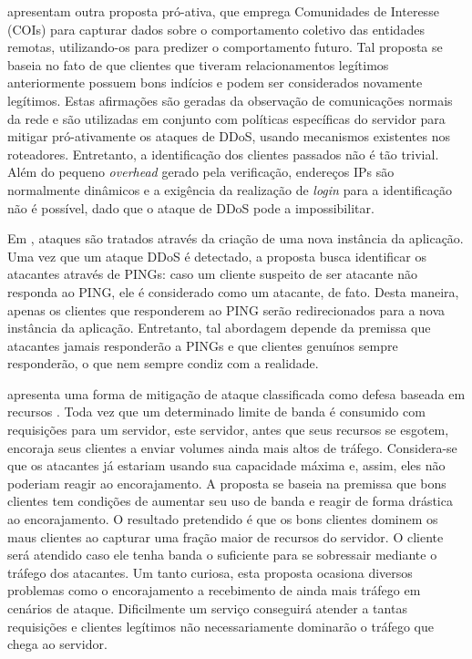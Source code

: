\cite{Verkaik:2006:PCD:1162666.1162673} apresentam outra proposta pró-ativa, que emprega Comunidades de Interesse (COIs) para capturar dados sobre o comportamento coletivo das entidades remotas, utilizando-os para predizer o comportamento futuro. Tal proposta se baseia no fato de que clientes que tiveram relacionamentos legítimos anteriormente possuem bons indícios e podem ser considerados novamente legítimos. Estas afirmações são geradas da observação de comunicações normais da rede e são utilizadas em conjunto com políticas específicas do servidor para mitigar pró-ativamente os ataques de DDoS, usando mecanismos existentes nos roteadores. 
%
Entretanto, a identificação dos clientes passados não é tão trivial. Além do pequeno \emph{overhead} gerado pela verificação, endereços IPs são normalmente dinâmicos e a exigência da realização de \emph{login} para a identificação não é possível, dado que o ataque de DDoS pode a impossibilitar.


Em \cite{Bakshi:10}, ataques são tratados através da criação de uma nova instância da aplicação. Uma vez que um ataque DDoS é detectado, a proposta busca identificar os atacantes através de PINGs: caso um cliente suspeito de ser atacante não responda ao PING, ele é considerado como um atacante, de fato. Desta maneira, apenas os clientes que responderem ao PING serão 
redirecionados para a nova instância da aplicação. Entretanto, tal abordagem depende da premissa que atacantes jamais responderão a PINGs e que clientes genuínos sempre responderão, o que nem sempre condiz com a realidade.




\cite{Walfish:2010:DDO:1731060.1731063} apresenta uma forma de mitigação de ataque classificada como defesa baseada em recursos \cite{Dwork:1992:PVP:646757.705669}. %
Toda vez que um determinado limite de banda é consumido com requisições para um servidor, este servidor, antes que seus recursos se esgotem, encoraja seus clientes a enviar volumes ainda mais altos de tráfego. Considera-se que os atacantes já estariam usando sua capacidade máxima e, assim, eles não poderiam reagir ao encorajamento. A proposta se baseia na premissa que bons clientes tem condições de aumentar seu uso de banda e reagir de forma drástica ao encorajamento. O resultado pretendido é que os bons clientes dominem os maus clientes ao capturar uma fração maior de recursos do servidor. O cliente será atendido caso ele tenha banda o suficiente para se sobressair mediante o tráfego dos atacantes. Um tanto curiosa, esta proposta ocasiona diversos problemas como %
o encorajamento a recebimento de ainda mais tráfego em cenários de ataque. 
Dificilmente um serviço conseguirá atender a tantas requisições e clientes legítimos não necessariamente dominarão o tráfego que chega ao servidor.


